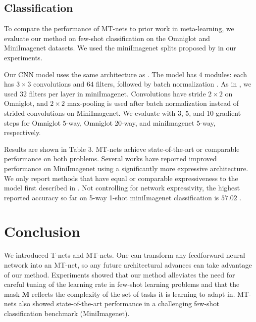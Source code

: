 \documentclass{article}
\newcommand{\0}{{\bf 0}}
\newcommand{\M}{\mathbf{M}}
\newcommand{\mask}{\M}
\begin{document}
\subsection{Classification }

To compare the performance of MT-nets to prior work in meta-learning, 
we evaluate our method on few-shot classification on the Omniglot \cite{Lake2015science} and MiniImagenet \cite{RaviS2017iclr} datasets.
We used the miniImagenet splits proposed by \cite{RaviS2017iclr} in our experiments.
\iffalse
The Omniglot dataset, sometimes referred to as the 'transpose of MNIST', consists of 1623 character classes from 50 different alphabets and has only 20 instances of each.
The MiniImagenet dataset is a subset of the full ImageNet dataset which has 100 different classes with 600 examples of each class.
\fi

Our CNN model uses the same architecture as \cite{FinnC2017icml}.
The model has $4$ modules: each has $3 \times 3$ convolutions and $64$ filters, followed by batch normalization \cite{Ioffe2015icml}.
As in \cite{FinnC2017icml}, we used 32 filters per layer in miniImagenet.
Convolutions have stride $2 \times 2$ on Omniglot, and $2 \times 2$ max-pooling is used after batch normalization
instead of strided convolutions on MiniImagenet.
We evaluate with 3, 5, and 10 gradient steps for Omniglot 5-way, Omniglot 20-way, and miniImagenet 5-way, respectively.

Results are shown in Table 3.
MT-nets achieve state-of-the-art or comparable performance on both problems.
Several works \cite{Mishra2018iclr,MunkhdalaiT2017icml,Sung2017arxiv} have reported improved performance on MiniImagenet using a significantly more expressive architecture.
We only report methods that have equal or comparable expressiveness to the model first described in \cite{VinyalsO2016nips}.
Not controlling for network expressivity, the highest reported accuracy so far on 5-way 1-shot miniImagenet classification is $57.02$ \cite{Sung2017arxiv}.



\section{Conclusion}

We introduced T-nets and MT-nets.
One can transform any feedforward neural network into an MT-net, so any future architectural advances can take advantage of our method.
Experiments showed that our method alleviates the need for careful tuning of the learning rate in few-shot learning problems 
and that the mask $\mask$ reflects the complexity of the set of tasks it is learning to adapt in.
MT-nets also showed state-of-the-art performance in a challenging few-shot classification benchmark (MiniImagenet).
\end{document}
